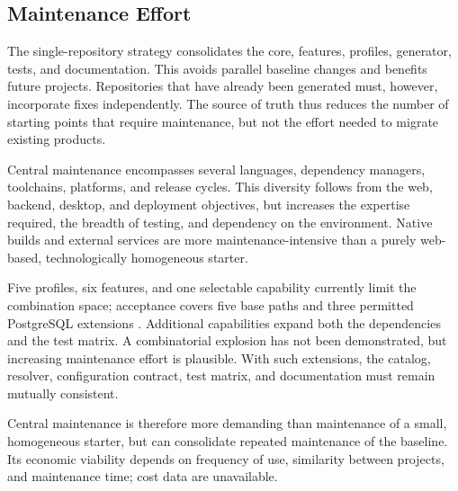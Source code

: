 \subsection{Maintenance Effort}
\label{subsec:wartungsaufwand}

The single-repository strategy consolidates the core, features, profiles,
generator, tests, and documentation. This avoids parallel baseline changes and
benefits future projects. Repositories that have already been generated must,
however, incorporate fixes independently.
The source of truth thus reduces the number of starting points that require
maintenance, but not the effort needed to migrate existing products.

Central maintenance encompasses several languages, dependency managers,
toolchains, platforms, and release cycles. This diversity follows from the
web, backend, desktop, and deployment objectives, but increases the expertise
required, the breadth of testing, and dependency on the environment.
Native builds and external services are more maintenance-intensive than a
purely web-based, technologically homogeneous starter.

Five profiles, six features, and one selectable capability currently limit the
combination space; acceptance covers five base paths and three permitted
PostgreSQL extensions \parencite{kleiveist2026acceptance}. Additional
capabilities expand both the dependencies and the test matrix. A combinatorial
explosion has not been demonstrated, but increasing maintenance effort is
plausible.
With such extensions, the catalog, resolver, configuration contract, test
matrix, and documentation must remain mutually consistent.

Central maintenance is therefore more demanding than maintenance of a small,
homogeneous starter, but can consolidate repeated maintenance of the baseline.
Its economic viability depends on frequency of use, similarity between
projects, and maintenance time; cost data are unavailable.
